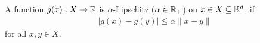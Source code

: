 \begin{definition}
\label{def:Lipschitz}
A function $g(x): X \to \mathbb{R}$ is $\alpha$-Lipschitz ($\alpha \in \mathbb{R}_+$) on $x \in X \subseteq \mathbb{R}^d$, if
\begin{align*}
    |g(x) - g(y)| \le \alpha \| x - y \|
\end{align*}
for all $x,y \in X$.
\end{definition}